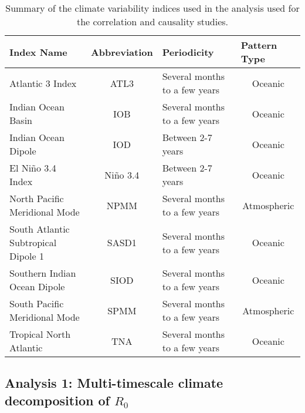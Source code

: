 \documentclass[fleqn,10pt]{wlscirep}
\begin{document}
\begin{table*}[t]
  \centering
  \begin{tabular}{l|c|l|c}
  \textbf{Index Name}                 & \multicolumn{1}{l|}{\textbf{Abbreviation}} & \textbf{Periodicity}          & \multicolumn{1}{l|}{\textbf{Pattern Type}} \\ \hline
  Atlantic 3 Index                    & ATL3                                       & Several months to a few years & Oceanic                                    \\
  Indian Ocean Basin                  & IOB                                        & Several months to a few years & Oceanic                                    \\
  Indian Ocean Dipole                 & IOD                                        & Between 2-7 years             & Oceanic                                    \\
  El Niño 3.4 Index                   & Niño 3.4                                   & Between 2-7 years             & Oceanic                                    \\
  North Pacific Meridional Mode       & NPMM                                       & Several months to a few years & Atmospheric                                \\
  South Atlantic Subtropical Dipole 1 & SASD1                                      & Several months to a few years & Oceanic                                    \\
  Southern Indian Ocean Dipole        & SIOD                                       & Several months to a few years & Oceanic                                    \\
  South Pacific Meridional Mode       & SPMM                                       & Several months to a few years & Atmospheric                                \\
  Tropical North Atlantic             & TNA                                        & Several months to a few years & Oceanic                                    
  \end{tabular}%
  \caption{Summary of the climate variability indices used in the analysis used for the correlation and causality studies.}
  \label{tab:climate-variability-indices}
  \end{table*}
    
  \subsection{Analysis 1: Multi-timescale climate decomposition of $R_0$} \label{sec-methods-1-analysis}
\end{document}
